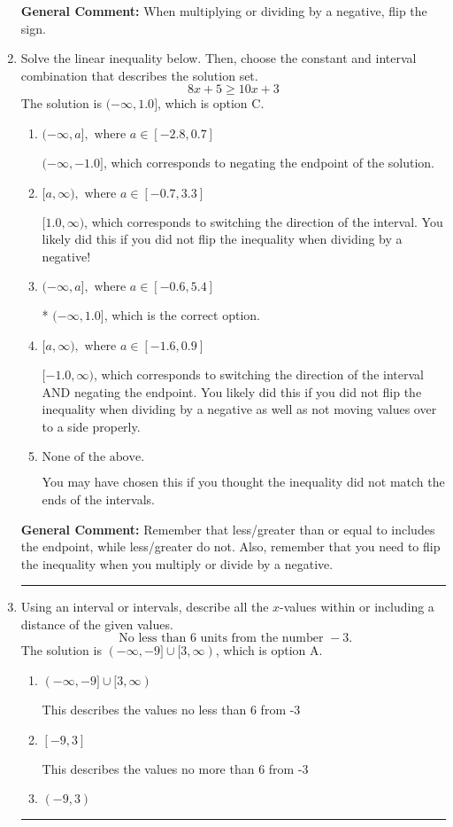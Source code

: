 \documentclass{extbook}[14pt]
\newcommand{\litem}[1]{\item #1

\rule{\textwidth}{0.4pt}}
\begin{document}
\begin{enumerate}
{\textbf{General Comment:} When multiplying or dividing by a negative, flip the sign.
}
\litem{
Solve the linear inequality below. Then, choose the constant and interval combination that describes the solution set.
\[ 8x + 5 \geq 10x + 3 \]The solution is \( (-\infty, 1.0] \), which is option C.\begin{enumerate}[label=\Alph*.]
\item \( (-\infty, a], \text{ where } a \in [-2.8, 0.7] \)

 $(-\infty, -1.0]$, which corresponds to negating the endpoint of the solution.
\item \( [a, \infty), \text{ where } a \in [-0.7, 3.3] \)

 $[1.0, \infty)$, which corresponds to switching the direction of the interval. You likely did this if you did not flip the inequality when dividing by a negative!
\item \( (-\infty, a], \text{ where } a \in [-0.6, 5.4] \)

* $(-\infty, 1.0]$, which is the correct option.
\item \( [a, \infty), \text{ where } a \in [-1.6, 0.9] \)

 $[-1.0, \infty)$, which corresponds to switching the direction of the interval AND negating the endpoint. You likely did this if you did not flip the inequality when dividing by a negative as well as not moving values over to a side properly.
\item \( \text{None of the above}. \)

You may have chosen this if you thought the inequality did not match the ends of the intervals.
\end{enumerate}

\textbf{General Comment:} Remember that less/greater than or equal to includes the endpoint, while less/greater do not. Also, remember that you need to flip the inequality when you multiply or divide by a negative.
}
\litem{
Using an interval or intervals, describe all the $x$-values within or including a distance of the given values.
\[ \text{ No less than } 6 \text{ units from the number } -3. \]The solution is \( (-\infty, -9] \cup [3, \infty) \), which is option A.\begin{enumerate}[label=\Alph*.]
\item \( (-\infty, -9] \cup [3, \infty) \)

This describes the values no less than 6 from -3
\item \( [-9, 3] \)

This describes the values no more than 6 from -3
\item \( (-9, 3) \)


\end{enumerate}}
\end{enumerate}
\end{document}
